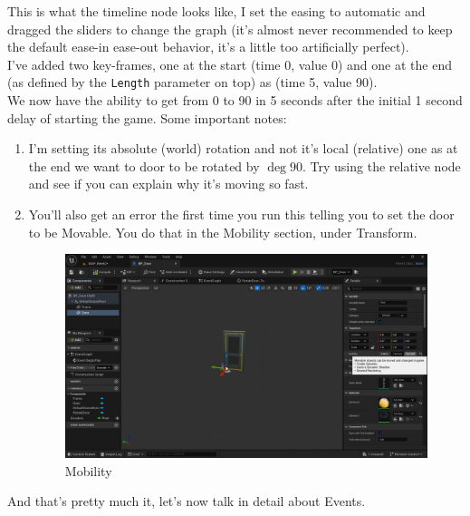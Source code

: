 \documentclass[]{article}
\begin{document}
	This is what the timeline node looks like, I set the easing to automatic and dragged the sliders to change the graph (it's almost never recommended to keep the default ease-in ease-out behavior, it's a little too artificially perfect). \\[10pt] I've added two key-frames, one at the start (time 0, value 0) and one at the end (as defined by the \verb*|Length| parameter on top) as (time 5, value 90). \\[10pt] We now have the ability to get from 0 to 90 in 5 seconds after the initial 1 second delay of starting the game.
	Some important notes:
	\begin{enumerate}
		\item I'm setting its absolute (world) rotation and not it's local (relative) one as at the end we want to door to be rotated by $\deg{90}$. Try using the relative node and see if you can explain why it's moving so fast.
		\item You'll also get an error the first time you run this telling you to set the door to be Movable. You do that in the Mobility section, under Transform.
		\begin{figure}[h]
			\centering
			\includegraphics[width=1\linewidth]{day4images/screenshot003}
			\caption{Mobility}
			\label{fig:screenshot003}
		\end{figure}
		
	\end{enumerate}
	\newpage
	And that's pretty much it, let's now talk in detail about Events.
	

	
\end{document}
